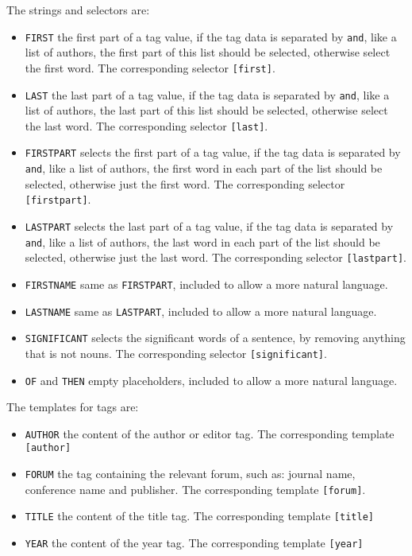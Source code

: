 The strings and selectors are:

\begin{itemize}
\item \texttt{FIRST} the first part of a tag value, if the tag data is
  separated by \texttt{and}, like a list of authors, the first part of
  this list should be selected, otherwise select the first word.  The
  corresponding selector \texttt{[first]}.
\item \texttt{LAST} the last part of a tag value, if the tag data is
  separated by \texttt{and}, like a list of authors, the last part of
  this list should be selected, otherwise select the last word.  The
  corresponding selector \texttt{[last]}.
\item \texttt{FIRSTPART} selects the first part of a tag value, if the
  tag data is separated by \texttt{and}, like a list of authors, the
  first word in each part of the list should be selected, otherwise
  just the first word.  The corresponding selector
  \texttt{[firstpart]}.
\item \texttt{LASTPART} selects the last part of a tag value, if the
  tag data is separated by \texttt{and}, like a list of authors, the
  last word in each part of the list should be selected, otherwise
  just the last word.  The corresponding selector \texttt{[lastpart]}.
\item \texttt{FIRSTNAME} same as \texttt{FIRSTPART}, included to allow
  a more natural language.
\item \texttt{LASTNAME} same as \texttt{LASTPART}, included to allow
  a more natural language.
\item \texttt{SIGNIFICANT} selects the significant words of a
  sentence, by removing anything that is not nouns.  The
  corresponding selector \texttt{[significant]}.  
\item \texttt{OF} and \texttt{THEN} empty placeholders, included to
  allow a more natural language.
\end{itemize}

The templates for tags are:

\begin{itemize}
\item \texttt{AUTHOR} the content of the author or editor tag.  The
  corresponding template \texttt{[author]}
\item \texttt{FORUM} the tag containing the relevant forum, such as:
  journal name, conference name and publisher.  The corresponding
  template \texttt{[forum]}.
\item \texttt{TITLE} the content of the title tag.  The corresponding
  template \texttt{[title]}
\item \texttt{YEAR} the content of the year tag.  The corresponding
  template \texttt{[year]}
\end{itemize}

